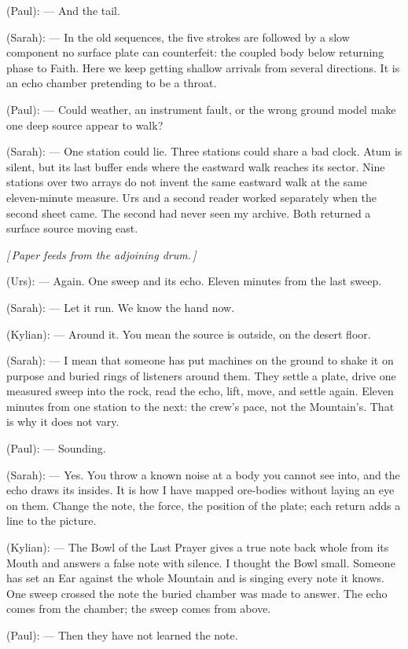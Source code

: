 \begin{room}
(Paul): --- And the tail.

(Sarah): --- In the old sequences, the five strokes are followed by a slow component no surface plate can counterfeit: the coupled body below returning phase to Faith. Here we keep getting shallow arrivals from several directions. It is an echo chamber pretending to be a throat.

(Paul): --- Could weather, an instrument fault, or the wrong ground model make one deep source appear to walk?

(Sarah): --- One station could lie. Three stations could share a bad clock. Atum is silent, but its last buffer ends where the eastward walk reaches its sector. Nine stations over two arrays do not invent the same eastward walk at the same eleven-minute measure. Urs and a second reader worked separately when the second sheet came. The second had never seen my archive. Both returned a surface source moving east.

\centerline{\textit{[\,Paper feeds from the adjoining drum.\,]}}

(Urs): --- Again. One sweep and its echo. Eleven minutes from the last sweep.

(Sarah): --- Let it run. We know the hand now.

(Kylian): --- Around it. You mean the source is outside, on the desert floor.

(Sarah): --- I mean that someone has put machines on the ground to shake it on purpose and buried rings of listeners around them. They settle a plate, drive one measured sweep into the rock, read the echo, lift, move, and settle again. Eleven minutes from one station to the next: the crew's pace, not the Mountain's. That is why it does not vary.

(Paul): --- Sounding.

(Sarah): --- Yes. You throw a known noise at a body you cannot see into, and the echo draws its insides. It is how I have mapped ore-bodies without laying an eye on them. Change the note, the force, the position of the plate; each return adds a line to the picture.

(Kylian): --- The Bowl of the Last Prayer gives a true note back whole from its Mouth and answers a false note with silence. I thought the Bowl small. Someone has set an Ear against the whole Mountain and is singing every note it knows. One sweep crossed the note the buried chamber was made to answer. The echo comes from the chamber; the sweep comes from above.

(Paul): --- Then they have not learned the note.


\end{room}
